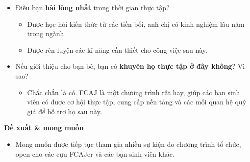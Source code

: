 \begin{itemize}
\tightlist
\item
  Điều bạn \textbf{hài lòng nhất} trong thời gian thực tập?

  \begin{itemize}
  \tightlist
  \item
    Được học hỏi kiến thức từ các tiền bối, anh chị có kinh nghiệm lâu
    năm trong ngành
  \item
    Được rèn luyện các kĩ năng cần thiết cho công việc sau này.\\
  \end{itemize}
\item
  Nếu giới thiệu cho bạn bè, bạn có \textbf{khuyên họ thực tập ở đây
  không}? Vì sao?

  \begin{itemize}
  \tightlist
  \item
    Chắc chắn là có. FCAJ là một chương trình rất hay, giúp các bạn sinh
    viên có được cơ hội thực tập, cung cấp nền tảng và các mối quan hệ
    quý giá để hỗ trợ họ sau này.
  \end{itemize}
\end{itemize}

\vspace{0.5em}\noindent\textbf{Đề xuất \& mong
muốn}\par

\begin{itemize}
\tightlist
\item
  Mong muốn được tiếp tục tham gia nhiều sự kiện do chương trình tổ
  chức, open cho các cựu FCAJer và các bạn sinh viên khác.
\end{itemize}
